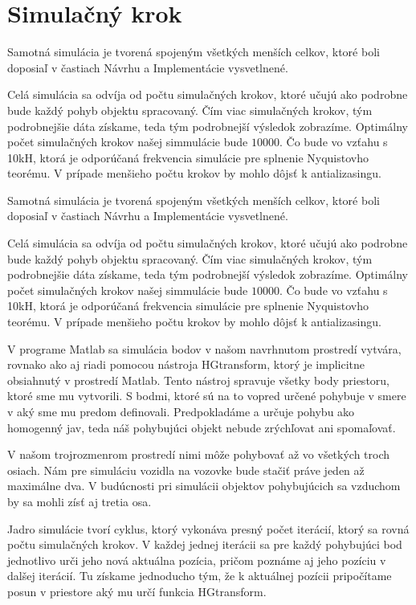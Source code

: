 \documentclass[slovak]{ExcelAtFIT} %
\begin{document}
  \section{Simulačný krok}
    \hspace{0.6cm}Samotná simulácia je tvorená spojeným všetkých menších celkov, ktoré boli doposiaľ v častiach Návrhu a Implementácie vysvetlnené.

    Celá simulácia sa odvíja od počtu simulačných krokov, ktoré učujú ako podrobne bude každý pohyb objektu spracovaný. Čím viac simulačných krokov, tým podrobnejšie dáta získame, teda tým podrobnejší výsledok zobrazíme. Optimálny počet simulačných krokov našej simmulácie bude $10 000$. Čo bude vo vzťahu s 10kH, ktorá je odporúčaná frekvencia simulácie pre splnenie Nyquistovho teorému. V prípade menšieho počtu krokov by mohlo dôjsť k antializasingu.\newline


    \hspace{0.6cm}Samotná simulácia je tvorená spojeným všetkých menších celkov, ktoré boli doposiaľ v častiach Návrhu a Implementácie vysvetlnené.

    Celá simulácia sa odvíja od počtu simulačných krokov, ktoré učujú ako podrobne bude každý pohyb objektu spracovaný. Čím viac simulačných krokov, tým podrobnejšie dáta získame, teda tým podrobnejší výsledok zobrazíme. Optimálny počet simulačných krokov našej simmulácie bude $10 000$. Čo bude vo vzťahu s 10kH, ktorá je odporúčaná frekvencia simulácie pre splnenie Nyquistovho teorému. V prípade menšieho počtu krokov by mohlo dôjsť k antializasingu.\newline

    V programe Matlab sa simulácia bodov v našom navrhnutom prostredí vytvára, rovnako ako aj riadi pomocou nástroja HGtransform, ktorý je implicitne obsiahnutý v prostredí Matlab. Tento nástroj spravuje všetky body priestoru, ktoré sme mu vytvorili. S bodmi, ktoré sú na to vopred určené pohybuje v smere v aký sme mu predom definovali. Predpokladáme a určuje pohybu ako homogenný jav, teda náš pohybujúci objekt nebude zrýchľovat ani spomaľovať.

    V našom trojrozmenrom prostredí nimi môže pohybovať až vo všetkých troch osiach. Nám pre simuláciu vozidla na vozovke bude stačiť práve jeden až maximálne dva. V budúcnosti pri simulácii objektov pohybujúcich sa vzduchom by sa mohli zísť aj tretia osa.
    \newline    

    Jadro simulácie tvorí cyklus, ktorý vykonáva presný počet iterácií, ktorý sa rovná počtu simulačných krokov. V každej jednej iterácii sa pre každý pohybujúci bod jednotlivo urči jeho nová aktuálna pozícia, pričom poznáme aj jeho pozíciu v dalšej iterácií. Tu získame jednoducho tým, že k aktuálnej pozícii pripočítame posun v priestore aký mu určí funkcia HGtransform. 
\end{document}
